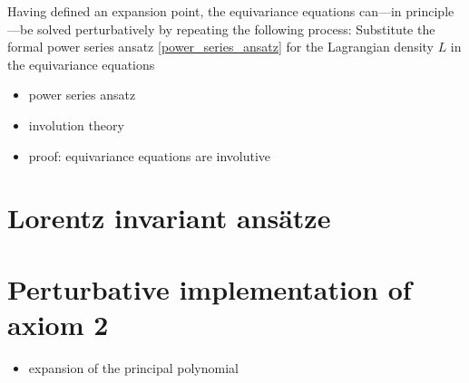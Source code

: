 Having defined an expansion point, the equivariance equations can---in principle---be solved perturbatively by repeating the following process: Substitute the formal power series ansatz \eqref{power_series_ansatz} for the Lagrangian density $L$ in the equivariance equations

\begin{itemize}
\item power series ansatz
\item involution theory
\item proof: equivariance equations are involutive
\end{itemize}

\section{Lorentz invariant ansätze}

\section{Perturbative implementation of axiom 2}
\begin{itemize}
\item expansion of the principal polynomial
\end{itemize}


